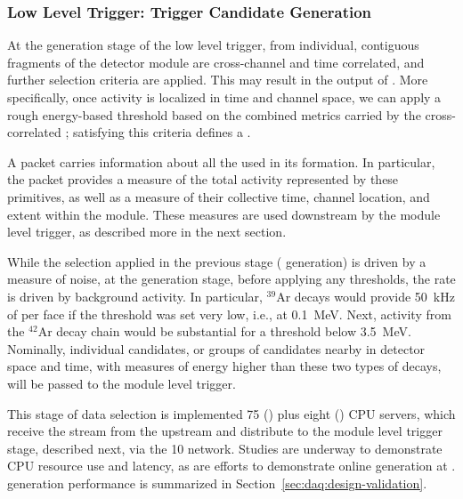 \subsubsection{Low Level Trigger: Trigger Candidate Generation}

At the  generation stage of the low level trigger,
 from individual, contiguous fragments of the
detector 
module are cross-channel and time correlated, and further selection
criteria are applied. This may result in the
output of . 
More specifically, once activity is localized in time and channel
space, we can apply a rough energy-based threshold based on the combined
metrics carried by the cross-correlated ;
satisfying this criteria defines a . 

A  packet carries information about all the   used in its formation. 
In particular, the packet provides a measure of the total activity represented
by these primitives, as well as a measure of their collective time, channel
location, and extent within the module.
These measures are used downstream by the module level trigger, 
as described more in the next section.

While the selection applied in the previous stage (
generation) is driven by a measure of noise, at the 
generation stage, before applying any thresholds, the rate is driven by
background activity.  
In particular, $^{39}$Ar decays would provide \SI{50}{\kilo\hertz} of
 per  face if the threshold was set very low, i.e., at
\SI{0.1}{\MeV}.
Next, activity from the $^{42}$Ar decay chain would be substantial for a
threshold below \SI{3.5}{\MeV}.
Nominally, individual candidates, or groups of candidates nearby in
detector space and time, with measures of energy higher than these two
types of decays, will be passed to the module level trigger. 

This stage of data selection is implemented \num{75} () plus eight
() CPU servers, which receive the  stream from the upstream  and distribute  to the module level trigger
stage, described next, via the \SI{10}{\Gbps}  network. Studies are underway to demonstrate CPU
resource use and latency, as are efforts to demonstrate online  generation
at .  generation performance is summarized in
Section~\ref{sec:daq:design-validation}. 


